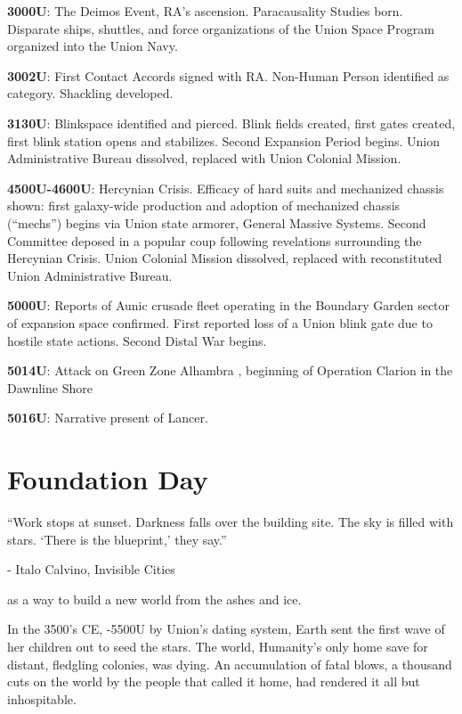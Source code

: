 \textbf{3000U}: The Deimos Event, RA’s ascension. Paracausality Studies born. Disparate ships, shuttles,
and force organizations of the Union Space Program organized into the Union Navy.

\textbf{3002U}: First Contact Accords signed with RA. Non-Human Person identified as category.
Shackling developed.

\textbf{3130U}: Blinkspace identified and pierced. Blink fields created, first gates created, first blink
station opens and stabilizes. Second Expansion Period begins. Union Administrative Bureau
dissolved, replaced with Union Colonial Mission.

\textbf{4500U-4600U}: Hercynian Crisis. Efficacy of hard suits and mechanized chassis shown: first
galaxy-wide production and adoption of mechanized chassis (``mechs'') begins via Union state
armorer, General Massive Systems. Second Committee deposed in a popular coup following
revelations surrounding the Hercynian Crisis. Union Colonial Mission dissolved, replaced with
reconstituted Union Administrative Bureau.

\textbf{5000U}: Reports of Aunic crusade fleet operating in the Boundary Garden sector of expansion
space confirmed. First reported loss of a Union blink gate due to hostile state actions. Second
Distal War begins.

\textbf{5014U}: Attack on Green Zone Alhambra , beginning of Operation Clarion in the Dawnline Shore

\textbf{5016U}: Narrative present of Lancer.

\section{Foundation Day}

\begin{epiQuote}
    ``Work stops at sunset. Darkness falls over the building site. The sky is filled with stars.
    `There is the blueprint,' they say.''

    
    \quad - Italo Calvino, \textnormal{Invisible Cities}
\end{epiQuote}

 as a way to build a new world from the ashes and ice.

In the 3500’s CE, -5500U by Union’s dating system, Earth sent the first wave of her children out
to seed the stars. The world, Humanity’s only home save for distant, fledgling colonies, was
dying. An accumulation of fatal blows, a thousand cuts on the world by the people that called it
home, had rendered it all but inhospitable.

